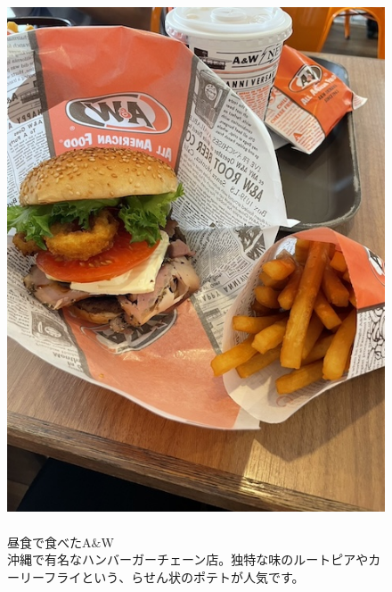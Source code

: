 \documentclass[../main]{subfiles}
\begin{document}
\begin{figure}[H]
  \begin{minipage}[b]{0.48\columnwidth}
    \caption{\\
    昼食で食べたA$\&$W\\
    沖縄で有名なハンバーガーチェーン店。独特な味のルートピアやカーリーフライという、らせん状のポテトが人気です。
    }
  \end{minipage}
  \hspace{0.04\columnwidth} %
  \begin{minipage}[b]{0.48\columnwidth}
    \centering
    \includegraphics[width=\columnwidth]{figure/aandw.jpg}
  \end{minipage}
\end{figure}
\end{document}
